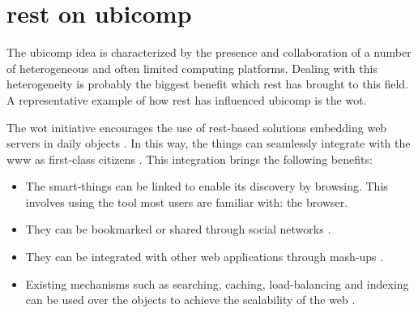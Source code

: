 \section{\acs{rest} on \acs{ubicomp}}
\label{sec:soa_ubicomp}

The \ac{ubicomp} idea is characterized by the presence and collaboration of a number of heterogeneous and often limited computing platforms.
Dealing with this heterogeneity is probably the biggest benefit which \ac{rest} has brought to this field.
A representative example of how \ac{rest} has influenced \ac{ubicomp} is the \acf{wot}.




The \acl{wot} initiative encourages the use of \acs{rest}-based solutions embedding web servers in daily objects \citep{guinard_internet_2011,guinard_thesis_2011}.
In this way, the things can seamlessly integrate with the \ac{www} as first-class citizens \citep{gupta_network_2011}. %
This integration brings the following benefits:
\begin{itemize}
  \item The smart-things can be linked to enable its discovery by browsing.
	This involves using the tool most users are familiar with: the browser.
  \item They can be bookmarked or shared through social networks \citep{guinard_sharing_2010}.
  \item They can be integrated with other web applications through mash-ups \citep{guinard_towards_2009,ostermaier_webplug:_2010,pintus_anatomy_2011,blackstock_wotkit:_2012,stirbu_towards_2008}.
  \item Existing mechanisms such as searching, caching, load-balancing and indexing can be used over the objects to achieve the scalability of the web \citep{gupta_early_2010}.
\end{itemize}





